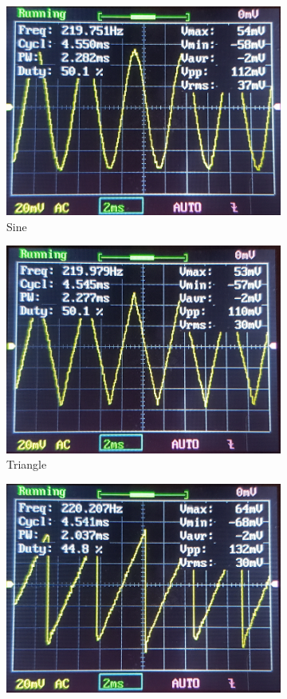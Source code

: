 \documentclass[12pt]{article}
\begin{document}
\begin{figure}[htb]
    \centering
    \begin{subfigure}{.49\textwidth}
        \centering
        \includegraphics[width=0.75\linewidth]{img/sine.png}
        \caption{Sine}
        \label{fig:sine}
    \end{subfigure}
    \begin{subfigure}{.49\textwidth}
        \centering
        \includegraphics[width=0.75\linewidth]{img/triangle.png}
        \caption{Triangle}
        \label{fig:triangle}
    \end{subfigure}
    \begin{subfigure}{.49\textwidth}
        \centering
        \includegraphics[width=0.75\linewidth]{img/saw.png}

\end{subfigure}
\end{figure}
\end{document}
